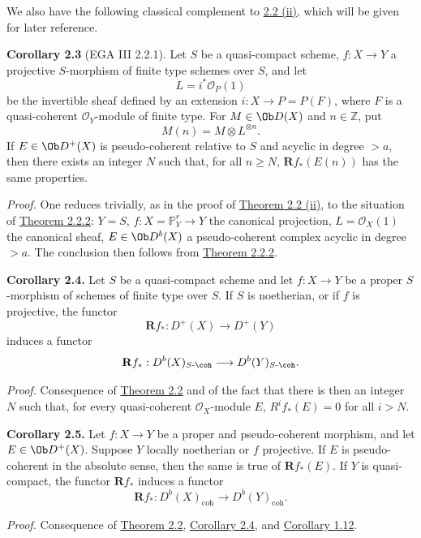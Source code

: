 We also have the following classical complement to \hyperlink{sga6.e03.thm.2-2}{2.2 (ii)}, which will be given for later reference.

\textbf{Corollary 2.3} (EGA III 2.2.1). Let \(S\) be a quasi-compact scheme, \(f:X\to Y\) a projective \(S\)-morphism of finite type schemes over \(S\), and let
\[
  L=i^*\mathcal O_P(1)
\]
be the invertible sheaf defined by an extension \(i:X\to P=P(F)\), where \(F\) is a quasi-coherent \(\mathcal O_Y\)-module of finite type. For \(M\in \Ob D(X)\) and \(n\in\mathbb Z\), put
\[
  M(n)=M\otimes L^{\otimes n}.
\]
If \(E\in \Ob D^+(X)\) is pseudo-coherent relative to \(S\) and acyclic in degree \(>a\), then there exists an integer \(N\) such that, for all \(n\geq N\), \(\mathbf Rf_*(E(n))\) has the same properties.

\emph{Proof.} One reduces trivially, as in the proof of \hyperlink{sga6.e03.thm.2-2}{Theorem 2.2 (ii)}, to the situation of \hyperlink{sga6.e03.thm.2-2-2}{Theorem 2.2.2}: \(Y=S\), \(f:X=\mathbb P^r_Y\to Y\) the canonical projection, \(L=\mathcal O_X(1)\) the canonical sheaf, \(E\in\Ob D^b(X)\) a pseudo-coherent complex acyclic in degree \(>a\). The conclusion then follows from \hyperlink{sga6.e03.thm.2-2-2}{Theorem 2.2.2}.

\textbf{Corollary 2.4.} Let \(S\) be a quasi-compact scheme and let \(f:X\to Y\) be a proper \(S\)-morphism of schemes of finite type over \(S\). If \(S\) is noetherian, or if \(f\) is projective, the functor
\[
  \mathbf Rf_*:D^+(X)\longrightarrow D^+(Y)
\]
induces a functor
\[
  \mathbf Rf_*:D^b(X)_{S\text{-}\coh}\longrightarrow D^b(Y)_{S\text{-}\coh}.
\]

\emph{Proof.} Consequence of \hyperlink{sga6.e03.thm.2-2}{Theorem 2.2} and of the fact that there is then an integer \(N\) such that, for every quasi-coherent \(\mathcal O_X\)-module \(E\), \(R^if_*(E)=0\) for all \(i>N\).

\textbf{Corollary 2.5.} Let \(f:X\to Y\) be a proper and pseudo-coherent morphism, and let \(E\in \Ob D^+(X)\). Suppose \(Y\) locally noetherian or \(f\) projective. If \(E\) is pseudo-coherent in the absolute sense, then the same is true of \(\mathbf Rf_*(E)\). If \(Y\) is quasi-compact, the functor \(\mathbf Rf_*\) induces a functor
\[
  \mathbf Rf_*:D^b(X)_{\mathrm{coh}}\longrightarrow D^b(Y)_{\mathrm{coh}}.
\]

\emph{Proof.} Consequence of \hyperlink{sga6.e03.thm.2-2}{Theorem 2.2}, \hyperlink{sga6.e03.cor.2-4}{Corollary 2.4}, and \hyperlink{sga6.e03.cor.1-12}{Corollary 1.12}.

